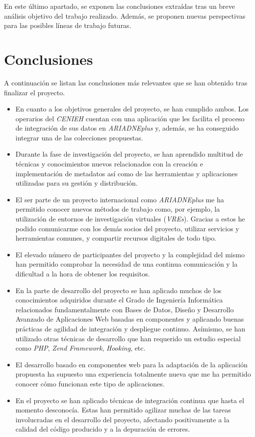 
En este último apartado, se exponen las conclusiones extraídas tras un
breve análisis objetivo del trabajo realizado. Además, se proponen
nuevas perspectivas para las posibles líneas de trabajo futuras.

\section{Conclusiones}

A continuación se listan las conclusiones más relevantes que se han
obtenido tras finalizar el proyecto.

\begin{itemize}
\tightlist
\item
  En cuanto a los objetivos generales del proyecto, se han
  cumplido ambos. Los operarios del \emph{CENIEH} cuentan con una
  aplicación que les facilita el proceso de integración de sus datos en
  \emph{ARIADNEplus} y, además, se ha conseguido integrar una de las
  colecciones propuestas.
\item
  Durante la fase de investigación del proyecto, se han aprendido
  multitud de técnicas y conocimientos nuevos relacionados con la
  creación e implementación de metadatos así como de las 
  herramientas y aplicaciones utilizadas para su gestión y distribución.
\item
  El ser parte de un proyecto internacional como \emph{ARIADNEplus} me
  ha permitido conocer nuevos métodos de trabajo como, por ejemplo, la
  utilización de entornos de investigación virtuales (\emph{VREs}).
  Gracias a estos he podido comunicarme con los demás socios del
  proyecto, utilizar servicios y herramientas comunes, y compartir
  recursos digitales de todo tipo.
\item 
  El elevado número de participantes del proyecto y la complejidad del 
  mismo han permitido comprobar la necesidad de una continua comunicación 
  y la dificultad a la hora de obtener los requisitos.
\item
  En la parte de desarrollo del proyecto se han aplicado muchos de
  los conocimientos adquiridos durante el Grado de Ingeniería Informática
  relacionados fundamentalmente con Bases de Datos, Diseño y Desarrollo 
  Avanzado de Aplicaciones Web basadas en componentes y aplicando buenas 
  prácticas de agilidad de integración y despliegue continuo. Asímismo, se han
  utilizado otras técnicas de desarrollo que han requerido un estudio especial como
  \emph{PHP}, \emph{Zend Framework}, \emph{Hooking}, etc.
\item
  El desarrollo basado en componentes web para la adaptación de
  la aplicación propuesta ha supuesto una experiencia totalmente nueva
  que me ha permitido conocer cómo funcionan este tipo de aplicaciones.
\item
  En el proyecto se han aplicado técnicas de integración continua que hasta
  el momento desconocía. Estas han permitido agilizar muchas de las tareas involucradas en el
  desarrollo del proyecto, afectando positivamente a la calidad del código producido y a la
  depuración de errores.
\end{itemize}

